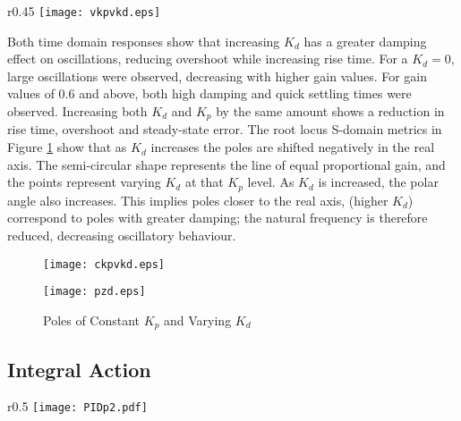 \begin{wrapfigure}{r}{0.45\textwidth}
\centering
\vspace{-15pt} %
\texttt{[image: vkpvkd.eps]}
\vspace{-10pt}
\caption{Time-Domain Response For Varying $K_p$ and Varying $K_d$}
\label{vkpvkd}
\vspace{-15pt}
\end{wrapfigure}

Both time domain responses show that increasing \(K_d\) has a greater
damping effect on oscillations, reducing overshoot while increasing rise
time. For a \(K_d = 0\), large oscillations were observed, decreasing
with higher gain values. For gain values of 0.6 and above, both high
damping and quick settling times were observed. Increasing both \(K_d\)
and \(K_p\) by the same amount shows a reduction in rise time, overshoot
and steady-state error. The root locus S-domain metrics in Figure
\ref{pzd} show that as \(K_d\) increases the poles are shifted
negatively in the real axis. The semi-circular shape represents the line
of equal proportional gain, and the points represent varying \(K_d\) at
that \(K_p\) level. As \(K_d\) is increased, the polar angle also
increases. This implies poles closer to the real axis, (higher \(K_d\))
correspond to poles with greater damping; the natural frequency is
therefore reduced, decreasing oscillatory behaviour.

\begin{figure}[H]
\centering
\begin{minipage}{.455\textwidth}
 \centering
 \texttt{[image: ckpvkd.eps]}
 \caption{Time-Domain Response For Constant $K_p$ and Varying $K_d$}
 \label{ckpvkd}
\end{minipage}
\hfill
\begin{minipage}{.455\textwidth}
\centering
\texttt{[image: pzd.eps]}
\caption{Poles of Constant $K_p$ and Varying $K_d$}
\label{pzd}
\end{minipage}
\vspace{-20pt}
\end{figure}

\subsection{Integral Action}\label{integral-action}

\begin{wrapfigure}{r}{0.5\textwidth}
\centering
\vspace{-35pt} %
\texttt{[image: PIDp2.pdf]}
\vspace{-15pt}
\caption{PID Feedback Controller}
\label{PIDp2}
\vspace{-15pt}
\end{wrapfigure}

